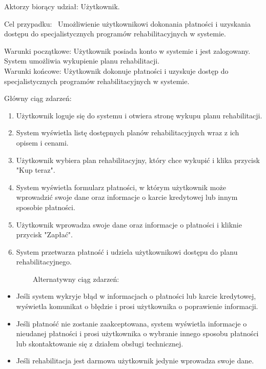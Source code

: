 \documentclass[
]{article}
\providecommand{\tightlist}{%
  \setlength{\itemsep}{0pt}\setlength{\parskip}{0pt}}
\begin{document}
{Aktorzy biorący udział: Użytkownik.}

{Cel przypadku: ~Umożliwienie użytkownikowi dokonania płatności i
uzyskania dostępu do specjalistycznych programów rehabilitacyjnych w
systemie.}

{Warunki początkowe: Użytkownik posiada konto w systemie i jest
zalogowany. System umożliwia wykupienie planu rehabilitacji.\\
Warunki końcowe: Użytkownik dokonuje płatności i uzyskuje dostęp do
specjalistycznych programów rehabilitacyjnych w systemie.}

{Główny ciąg zdarzeń:}

\begin{enumerate}
\tightlist
\item
  {Użytkownik loguje się do systemu i otwiera stronę wykupu planu
  rehabilitacji.}
\item
  {System wyświetla listę dostępnych planów rehabilitacyjnych wraz z ich
  opisem i cenami.}
\item
  {Użytkownik wybiera plan rehabilitacyjny, który chce wykupić i klika
  przycisk "Kup teraz".}
\item
  {System wyświetla formularz płatności, w którym użytkownik może
  wprowadzić swoje dane oraz informacje o karcie kredytowej lub innym
  sposobie płatności.}
\item
  {Użytkownik wprowadza swoje dane oraz informacje o płatności i kliknie
  przycisk "Zapłać".}
\item
  {System przetwarza płatność i udziela użytkownikowi dostępu do planu
  rehabilitacyjnego.}
\end{enumerate}

{~~~~~~~~Alternatywny ciąg zdarzeń:}

\begin{itemize}
\tightlist
\item
  {Jeśli system wykryje błąd w informacjach o płatności lub karcie
  kredytowej, wyświetla komunikat o błędzie i prosi użytkownika o
  poprawienie informacji.}
\item
  {Jeśli płatność nie zostanie zaakceptowana, system wyświetla
  informacje o nieudanej płatności i prosi użytkownika o wybranie innego
  sposobu płatności lub skontaktowanie się z działem obsługi
  technicznej.}
\item
  {Jeśli rehabilitacja jest darmowa użytkownik jedynie wprowadza swoje
  dane.}
\end{itemize}

{\hfill\break
}
\end{document}

